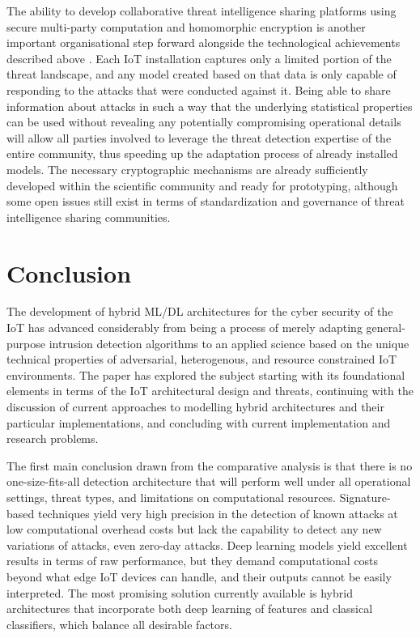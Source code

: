 \documentclass[12pt]{article}
\begin{document}
The ability to develop collaborative threat intelligence sharing platforms using secure multi-party computation and homomorphic encryption is another important organisational step forward alongside the technological achievements described above \cite{nguyen2019diot}. Each IoT installation captures only a limited portion of the threat landscape, and any model created based on that data is only capable of responding to the attacks that were conducted against it. Being able to share information about attacks in such a way that the underlying statistical properties can be used without revealing any potentially compromising operational details will allow all parties involved to leverage the threat detection expertise of the entire community, thus speeding up the adaptation process of already installed models. The necessary cryptographic mechanisms are already sufficiently developed within the scientific community and ready for prototyping, although some open issues still exist in terms of standardization and governance of threat intelligence sharing communities.


\section{Conclusion}

The development of hybrid ML/DL architectures for the cyber security of the IoT has advanced considerably from being a process of merely adapting general-purpose intrusion detection algorithms to an applied science based on the unique technical properties of adversarial, heterogenous, and resource constrained IoT environments. The paper has explored the subject starting with its foundational elements in terms of the IoT architectural design and threats, continuing with the discussion of current approaches to modelling hybrid architectures and their particular implementations, and concluding with current implementation and research problems.

The first main conclusion drawn from the comparative analysis is that there is no one-size-fits-all detection architecture that will perform well under all operational settings, threat types, and limitations on computational resources. Signature-based techniques yield very high precision in the detection of known attacks at low computational overhead costs but lack the capability to detect any new variations of attacks, even zero-day attacks. Deep learning models yield excellent results in terms of raw performance, but they demand computational costs beyond what edge IoT devices can handle, and their outputs cannot be easily interpreted. The most promising solution currently available is hybrid architectures that incorporate both deep learning of features and classical classifiers, which balance all desirable factors.
\end{document}
